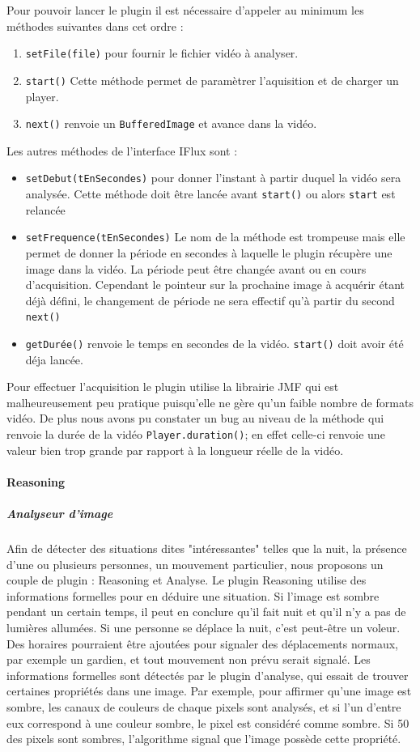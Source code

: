 		Pour pouvoir lancer le plugin il est nécessaire d'appeler au minimum les méthodes suivantes dans cet ordre :
		\begin{enumerate}
			\item{\verb+setFile(file)+} pour fournir le fichier vidéo à analyser.
			\item{\verb+start()+} Cette méthode permet de paramètrer l'aquisition et de charger un player. 
			\item{\verb+next()+} renvoie un \verb+BufferedImage+ et avance dans la vidéo.
		\end{enumerate}

		Les autres méthodes de l'interface IFlux sont :
		\begin{itemize}
			\item{\verb+setDebut(tEnSecondes)+} pour donner l'instant à partir duquel la vidéo sera analysée. Cette méthode doit être lancée avant \verb+start()+ ou alors \verb+start+ est relancée
			\item{\verb+setFrequence(tEnSecondes)+} Le nom de la méthode est trompeuse mais elle permet de donner la période en secondes à laquelle le plugin récupère une image dans la vidéo. La période peut être changée avant ou en cours d'acquisition. Cependant le pointeur sur la prochaine image à acquérir étant déjà défini, le changement de période ne sera effectif qu'à partir du second \verb+next()+
			\item{\verb+getDurée()+} renvoie le temps en secondes de la vidéo. \verb+start()+ doit avoir été déja lancée.
		\end{itemize}

	Pour effectuer l'acquisition le plugin utilise la librairie JMF qui est malheureusement peu pratique puisqu'elle ne gère qu'un faible nombre de formats vidéo. De plus nous avons pu constater un bug au niveau de la méthode qui renvoie la durée de la vidéo \verb+Player.duration()+; en effet celle-ci renvoie une valeur bien trop grande par rapport à la longueur réelle de la vidéo.

		\paragraph{Reasoning}
			\subparagraph{Analyseur d'image}
				Afin de détecter des situations dites "intéressantes" telles que la nuit, la présence d'une ou plusieurs personnes, un mouvement particulier, nous proposons un couple de plugin : Reasoning et Analyse. Le plugin Reasoning utilise des informations formelles pour en déduire une situation. Si l'image est sombre pendant un certain temps, il peut en conclure qu'il fait nuit et qu'il n'y a pas de lumières allumées. Si une personne se déplace la nuit, c'est peut-être un voleur. Des horaires pourraient être ajoutées pour signaler des déplacements normaux, par exemple un gardien, et tout mouvement non prévu serait signalé.
	Les informations formelles sont détectés par le plugin d'analyse, qui essait de trouver certaines propriétés dans une image. Par exemple, pour affirmer qu'une image est sombre, les canaux de couleurs de chaque pixels sont analysés, et si l'un d'entre eux correspond à une couleur sombre, le pixel est considéré comme sombre. Si 50 des pixels sont sombres, l'algorithme signal que l'image possède cette propriété.
	
